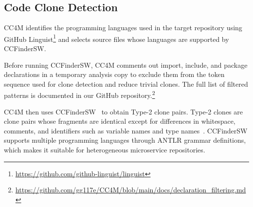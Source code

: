 \documentclass[conference]{IEEEtran}
\begin{document}
\subsection{Code Clone Detection}
\label{sec:clone_detection}

\textsc{CC4M} identifies the programming languages used in the target
repository using GitHub Linguist\footnote{\url{https://github.com/github-linguist/linguist}}
and selects source files whose languages are supported by CCFinderSW.

Before running CCFinderSW, \textsc{CC4M} comments out import, include,
and package declarations in a temporary analysis copy to exclude them
from the token sequence used for clone detection and reduce trivial clones.
The full list of filtered patterns is documented in our GitHub repository.\footnote{\url{https://github.com/gg117e/CC4M/blob/main/docs/declaration_filtering.md}}

\textsc{CC4M} then uses CCFinderSW~\cite{Semura2017CCFinderSW} to obtain
Type-2 clone pairs. Type-2 clones are clone pairs whose fragments are
identical except for differences in whitespace, comments, and identifiers
such as variable names and type names~\cite{RoyCordy2009}.
CCFinderSW supports multiple programming languages through ANTLR grammar
definitions, which makes it suitable for heterogeneous microservice
repositories.




\end{document}
